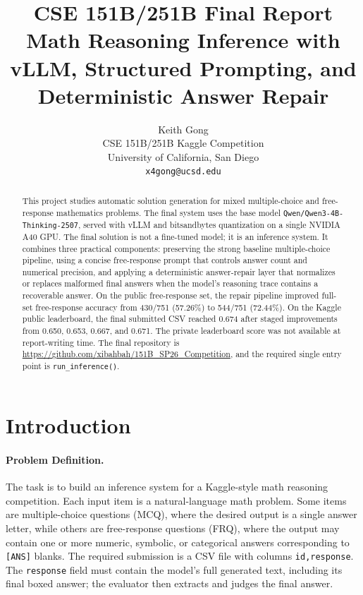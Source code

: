 \documentclass{article}
\title{
CSE 151B/251B Final Report\\
Math Reasoning Inference with vLLM, Structured Prompting, and Deterministic Answer Repair
}
\author{%
  Keith Gong\\
  CSE 151B/251B Kaggle Competition\\
  University of California, San Diego\\
  \texttt{x4gong@ucsd.edu}
}
\begin{document}
\maketitle

\begin{abstract}
This project studies automatic solution generation for mixed multiple-choice and free-response mathematics problems. The final system uses the base model \texttt{Qwen/Qwen3-4B-Thinking-2507}, served with vLLM and bitsandbytes quantization on a single NVIDIA A40 GPU. The final solution is not a fine-tuned model; it is an inference system. It combines three practical components: preserving the strong baseline multiple-choice pipeline, using a concise free-response prompt that controls answer count and numerical precision, and applying a deterministic answer-repair layer that normalizes or replaces malformed final answers when the model's reasoning trace contains a recoverable answer. On the public free-response set, the repair pipeline improved full-set free-response accuracy from 430/751 (57.26\%) to 544/751 (72.44\%). On the Kaggle public leaderboard, the final submitted CSV reached 0.674 after staged improvements from 0.650, 0.653, 0.667, and 0.671. The private leaderboard score was not available at report-writing time. The final repository is \href{https://github.com/xibahbah/151B_SP26_Competition}{https://github.com/xibahbah/151B\_SP26\_Competition}, and the required single entry point is \texttt{run\_inference()}.
\end{abstract}

\section{Introduction}
\label{sec:intro}

\paragraph{Problem Definition.}
The task is to build an inference system for a Kaggle-style math reasoning competition. Each input item is a natural-language math problem. Some items are multiple-choice questions (MCQ), where the desired output is a single answer letter, while others are free-response questions (FRQ), where the output may contain one or more numeric, symbolic, or categorical answers corresponding to \texttt{[ANS]} blanks. The required submission is a CSV file with columns \texttt{id,response}. The \texttt{response} field must contain the model's full generated text, including its final boxed answer; the evaluator then extracts and judges the final answer.
\end{document}
